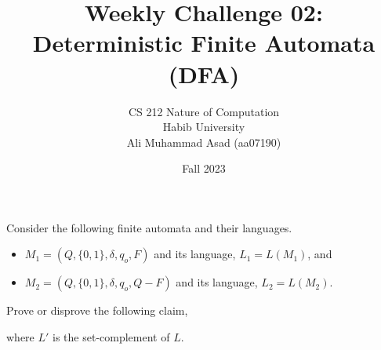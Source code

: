 \documentclass[a4paper]{exam}
\title{Weekly Challenge 02: Deterministic Finite Automata (DFA)}
\author{CS 212 Nature of Computation\\Habib University \\ Ali Muhammad Asad (aa07190)}
\date{Fall 2023}
\begin{document}
\maketitle

\begin{questions}
  

Consider the following finite automata and their languages.
\begin{itemize}
\item $M_1=(Q, \{0,1\}, \delta, q_o, F)$ and its language, $L_1=L(M_1)$, and
\item $M_2=(Q, \{0,1\}, \delta, q_o, Q-F)$ and its language, $L_2=L(M_2)$.
\end{itemize}

Prove or disprove the following claim,

\centerline{
}
where $L'$ is the set-complement of $L$.

\begin{solution}






\end{solution}
\end{questions}
\end{document}
